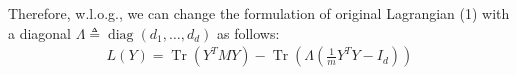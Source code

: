 \documentclass[10pt]{article}
\begin{document}
Therefore, w.l.o.g., we can change the formulation of original Lagrangian (1) with a diagonal $\Lambda \triangleq \operatorname{diag}\left(d_{1}, \ldots, d_{d}\right)$ as follows:
\begin{align*}
\tag{4} L(Y)=\operatorname{Tr}\left(Y^{T} M Y\right)-\operatorname{Tr}\left(\Lambda\left(\frac{1}{m} Y^{T} Y-I_{d}\right)\right)
\end{align*}
%
%
%
%


\end{document}
